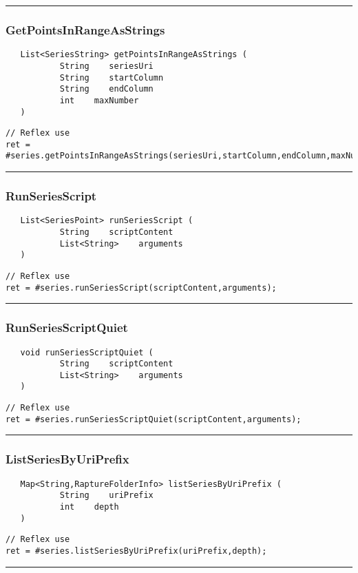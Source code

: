 \rule{15cm}{2pt}
\subsubsection{GetPointsInRangeAsStrings}
\label{Api:GetPointsInRangeAsStrings}
\begin{verbatim}
   List<SeriesString> getPointsInRangeAsStrings (
           String    seriesUri
           String    startColumn
           String    endColumn
           int    maxNumber
   )
\end{verbatim}
\begin{lstlisting}[language=reflex]
// Reflex use
ret = #series.getPointsInRangeAsStrings(seriesUri,startColumn,endColumn,maxNumber);
\end{lstlisting}



\rule{15cm}{2pt}
\subsubsection{RunSeriesScript}
\label{Api:RunSeriesScript}
\begin{verbatim}
   List<SeriesPoint> runSeriesScript (
           String    scriptContent
           List<String>    arguments
   )
\end{verbatim}
\begin{lstlisting}[language=reflex]
// Reflex use
ret = #series.runSeriesScript(scriptContent,arguments);
\end{lstlisting}



\rule{15cm}{2pt}
\subsubsection{RunSeriesScriptQuiet}
\label{Api:RunSeriesScriptQuiet}
\begin{verbatim}
   void runSeriesScriptQuiet (
           String    scriptContent
           List<String>    arguments
   )
\end{verbatim}
\begin{lstlisting}[language=reflex]
// Reflex use
ret = #series.runSeriesScriptQuiet(scriptContent,arguments);
\end{lstlisting}



\rule{15cm}{2pt}
\subsubsection{ListSeriesByUriPrefix}
\label{Api:ListSeriesByUriPrefix}
\begin{verbatim}
   Map<String,RaptureFolderInfo> listSeriesByUriPrefix (
           String    uriPrefix
           int    depth
   )
\end{verbatim}
\begin{lstlisting}[language=reflex]
// Reflex use
ret = #series.listSeriesByUriPrefix(uriPrefix,depth);
\end{lstlisting}



\rule{15cm}{2pt}
